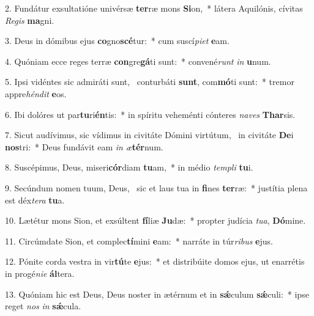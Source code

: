 2. Fundátur exsultatióne univérsæ \textbf{ter}ræ mons \textbf{Si}on,~*  látera Aquilónis, cívitas \textit{Re}\textit{gis} \textbf{ma}gni.\

3. Deus in dómibus ejus \textbf{co}gno\textbf{scé}tur:~*  cum suscí\textit{pi}\textit{et} \textbf{e}am.\

4. Quóniam ecce reges terræ \textbf{con}gre\textbf{gá}ti sunt:~*  convené\textit{runt} \textit{in} \textbf{u}num.\

5. Ipsi vidéntes sic admiráti sunt, \dag\  conturbáti \textbf{sunt}, com\textbf{mó}ti sunt:~*  tremor appre\textit{hén}\textit{dit} \textbf{e}os.\

6. Ibi dolóres ut par\textbf{tu}ri\textbf{én}tis:~*  in spíritu veheménti cónteres \textit{na}\textit{ves} \textbf{Thar}sis.\

7. Sicut audívimus, sic vídimus in civitáte Dómini virtútum, \dag\  in civitáte \textbf{De}i \textbf{nos}tri:~*  Deus fundávit eam \textit{in} \textit{æ}\textbf{tér}num.\

8. Suscépimus, Deus, miseri\textbf{cór}diam \textbf{tu}am,~*  in médio \textit{tem}\textit{pli} \textbf{tu}i.\

9. Secúndum nomen tuum, Deus, \dag\  sic et laus tua in \textbf{fi}nes \textbf{ter}ræ:~*  justítia plena est déx\textit{te}\textit{ra} \textbf{tu}a.\

10. Lætétur mons Sion, et exsúltent \textbf{fí}liæ \textbf{Ju}dæ:~*  propter judícia \textit{tu}\textit{a}, \textbf{Dó}mine.\

11. Circúmdate Sion, et complec\textbf{tí}mini \textbf{e}am:~*  narráte in túr\textit{ri}\textit{bus} \textbf{e}jus.\

12. Pónite corda vestra in vir\textbf{tú}te \textbf{e}jus:~*  et distribúite domos ejus, ut enarrétis in progé\textit{ni}\textit{e} \textbf{ál}tera.\

13. Quóniam hic est Deus, Deus noster in ætérnum et in \textbf{sǽ}culum \textbf{sǽ}culi:~*  ipse reget \textit{nos} \textit{in} \textbf{sǽ}cula.\

